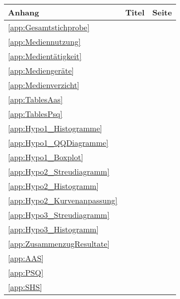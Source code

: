 \begin{table}[ht]
\begin{tabular}{l m{27em}  r}
  \hline
  Anhang & Titel & Seite \\
  \hline
  \ref{app:Gesamtstichprobe} & \nameref{app:Gesamtstichprobe} &   \pageref{app:Gesamtstichprobe}\\
  \ref{app:Mediennutzung} & \nameref{app:Mediennutzung} & \pageref{app:Mediennutzung}\\
  \ref{app:Medientätigkeit} & \nameref{app:Medientätigkeit} & \pageref{app:Medientätigkeit}\\
  \ref{app:Mediengeräte} & \nameref{app:Mediengeräte} & \pageref{app:Mediengeräte}\\
  \ref{app:Medienverzicht} & \nameref{app:Medienverzicht} & \pageref{app:Medienverzicht}\\
  \ref{app:TablesAas} & \nameref{app:TablesAas} & \pageref{app:TablesAas}\\
  \ref{app:TablesPsq} & \nameref{app:TablesPsq} & \pageref{app:TablesPsq}\\
  \ref{app:Hypo1_Histogramme} & \nameref{app:Hypo1_Histogramme} & \pageref{app:Hypo1_Histogramme}\\
  \ref{app:Hypo1_QQDiagramme} & \nameref{app:Hypo1_QQDiagramme} & \pageref{app:Hypo1_QQDiagramme}\\
  \ref{app:Hypo1_Boxplot} & \nameref{app:Hypo1_Boxplot} & \pageref{app:Hypo1_Boxplot}\\
  \ref{app:Hypo2_Streudiagramm} & \nameref{app:Hypo2_Streudiagramm} & \pageref{app:Hypo2_Streudiagramm}\\
  \ref{app:Hypo2_Histogramm} & \nameref{app:Hypo2_Histogramm} & \pageref{app:Hypo2_Histogramm}\\
  \ref{app:Hypo2_Kurvenanpassung} & \nameref{app:Hypo2_Kurvenanpassung} & \pageref{app:Hypo2_Kurvenanpassung}\\
  \ref{app:Hypo3_Streudiagramm} & \nameref{app:Hypo3_Streudiagramm} & \pageref{app:Hypo3_Streudiagramm}\\
  \ref{app:Hypo3_Histogramm} & \nameref{app:Hypo3_Histogramm} & \pageref{app:Hypo3_Histogramm}\\
  \ref{app:ZusammenzugResultate} & \nameref{app:ZusammenzugResultate} & \pageref{app:ZusammenzugResultate}\\
  \ref{app:AAS} & \nameref{app:AAS} & \pageref{app:AAS}\\
  \ref{app:PSQ} & \nameref{app:PSQ} & \pageref{app:PSQ}\\
  \ref{app:SHS} & \nameref{app:SHS} & \pageref{app:SHS}\\

\end{tabular}
\end{table}
